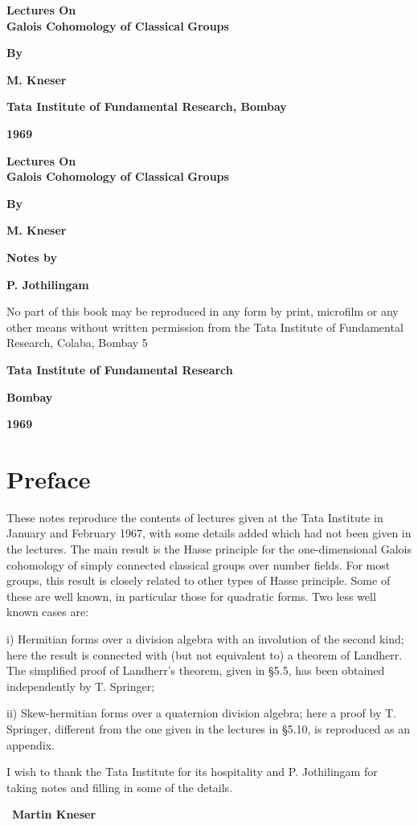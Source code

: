 \thispagestyle{empty}

\begin{center}
{\Large\bf Lectures On}\\[5pt]
{\Large\bf Galois Cohomology of Classical}
{\Large\bf Groups}
\vskip 1cm


{\bf By}
\medskip

{\large\bf M. Kneser}
\vfill

{\bf Tata Institute of Fundamental Research, Bombay}
\medskip

{\bf 1969}
\end{center}
\eject


\thispagestyle{empty}
\begin{center}
{\Large\bf Lectures On}\\[5pt]
{\Large\bf Galois Cohomology of Classical}
{\Large\bf Groups}
\vskip 1cm


{\bf By}
\medskip

{\large\bf M. Kneser}
\vfill

{\bf Notes by}
\medskip

{\large\bf P. Jothilingam}
\vfill

\parbox{0.7\textwidth}{No part of this book may be reproduced
in any form by print, microfilm or any
other means without written permission
from the Tata Institute of Fundamental
Research, Colaba, Bombay 5}
\vfill

{\bf Tata Institute of Fundamental Research}

{\bf Bombay}

{\bf 1969}
\end{center}
\eject

\chapter{Preface}


These notes reproduce the contents of lectures given at the Tata
Institute in January and February 1967, with some details added which
had not been given in the lectures. The main result is the Hasse
principle for the one-dimensional Galois cohomology of simply
connected classical groups over number fields. For most groups, this
result is closely related to other types of Hasse principle. Some of
these are well known, in particular those for quadratic forms. Two
less well known cases are: 

i) Hermitian forms over a division algebra
with an involution of the second kind; here the result is connected
with (but not equivalent to) a theorem of Landherr. The simplified
proof of Landherr's theorem, given in \S 5.5, has been obtained
independently by T. Springer;

 ii) Skew-hermitian forms over a quaternion division algebra; here a
 proof by T. Springer, different from the one given in the lectures in
 \S 5.10, is reproduced as an appendix.

I wish to thank the Tata Institute for its hospitality and
P. Jothilingam for taking notes and filling in some of the details.
\bigskip


~\hfill{\large\bf Martin Kneser}
